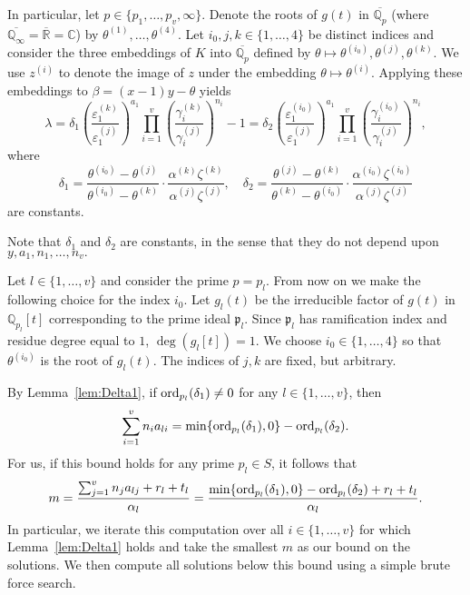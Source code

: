 In particular, let $p \in \{p_1, \dots, p_v, \infty\}$. Denote the roots of $g(t)$ in $\overline{\mathbb{Q}_p}$ (where $\overline{\mathbb{Q}_{\infty}} = \overline{\mathbb{R}} = \mathbb{C}$) by $\theta^{(1)}, \dots, \theta^{(4)}$. Let $i_0, j, k \in \{1, \dots, 4\}$ be distinct indices and consider the three embeddings of $K$ into $\overline{\mathbb{Q}_p}$ defined by $\theta \mapsto \theta^{(i_0)}, \theta^{(j)}, \theta^{(k)}$. We use $z^{(i)}$ to denote the image of $z$ under the embedding $\theta \mapsto \theta^{(i)}$. Applying these embeddings to $\beta = (x-1)y - \theta$ yields
\begin{equation}\label{Eq:Sunit}
\lambda = \delta_1 \left( \frac{\varepsilon_1^{(k)}}{\varepsilon_1^{(j)}}\right)^{a_1}\prod_{i = 1}^v \left( \frac{\gamma_i^{(k)}}{\gamma_i^{(j)}}\right)^{n_i} - 1 = \delta_2 \left( \frac{\varepsilon_1^{(i_0)}}{\varepsilon_1^{(j)}}\right)^{a_1} \prod_{i = 1}^v \left( \frac{\gamma_i^{(i_0)}}{\gamma_i^{(j)}}\right)^{n_i},
\end{equation}
where
\[\delta_1 = \frac{\theta^{(i_0)} - \theta^{(j)}}{\theta^{(i_0)} - \theta^{(k)}}\cdot\frac{\alpha^{(k)}\zeta^{(k)}}{\alpha^{(j)}\zeta^{(j)}}, \quad \delta_2 = \frac{\theta^{(j)} - \theta^{(k)}}{\theta^{(k)} - \theta^{(i_0)}}\cdot \frac{\alpha^{(i_0)}\zeta^{(i_0)}}{\alpha^{(j)}\zeta^{(j)}}\]
are constants. 

Note that $\delta_1$ and $\delta_2$ are constants, in the sense that they do not depend upon $y,a_1,n_1, \dots, n_v.$

Let $l \in \{1, \dots, v\}$ and consider the prime $p = p_l$. From now on we make the following choice for the index $i_0$. Let $g_l(t)$ be the irreducible factor of $g(t)$ in $\mathbb{Q}_{p_l}[t]$ corresponding to the prime ideal $\mathfrak{p}_l$. Since $\mathfrak{p}_l$ has ramification index and residue degree equal to $1$, $\deg(g_l[t]) = 1$. We choose $i_0 \in \{1, \dots, 4\}$ so that $\theta^{(i_0)}$ is the root of $g_l(t)$. The indices of $j,k$ are fixed, but arbitrary. 

By Lemma~\ref{lem:Delta1}, if $\operatorname{ord}_{p_l}(\delta_1) \neq 0$ for any $l \in \{1, \dots, v\}$, then 
\[ \sum_{i = 1}^v n_ia_{li} = \min\{\operatorname{ord}_{p_l}(\delta_1), 0\} - \operatorname{ord}_{p_l}(\delta_2).\]
For us, if this bound holds for any prime $p_l \in S$, it follows that
\[m = \frac{\sum_{j = 1}^{v}n_ja_{lj} + r_l + t_l}{\alpha_l} = \frac{\min\{\operatorname{ord}_{p_l}(\delta_1), 0\} - \operatorname{ord}_{p_l}(\delta_2) + r_l + t_l}{\alpha_l}. \]
In particular, we iterate this computation over all $i \in \{1, \dots, v \}$ for which Lemma~\ref{lem:Delta1} holds and take the smallest $m$ as our bound on the solutions. We then compute all solutions below this bound using a simple brute force search. 

